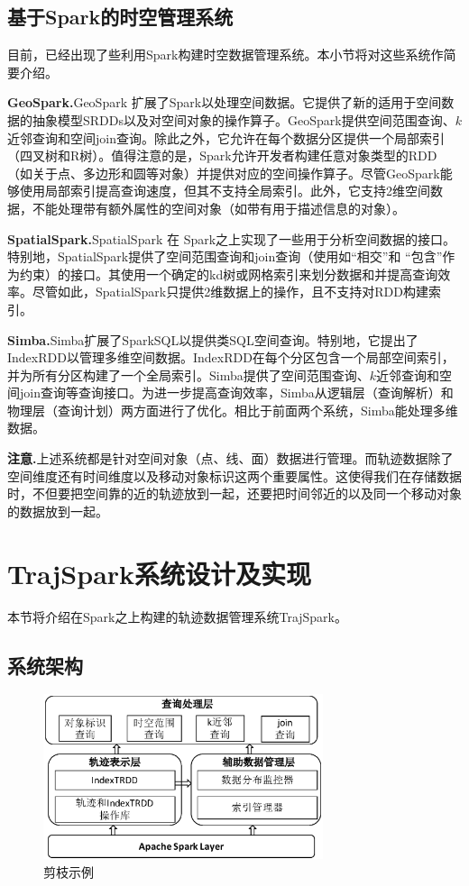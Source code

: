 \subsection{基于Spark的时空管理系统}
目前，已经出现了些利用Spark构建时空数据管理系统。本小节将对这些系统作简要介绍。

\textbf{GeoSpark.}GeoSpark 扩展了Spark以处理空间数据。它提供了新的适用于空间数据的抽象模型SRDDs以及对空间对象的操作算子。GeoSpark提供空间范围查询、$k$近邻查询和空间join查询。除此之外，它允许在每个数据分区提供一个局部索引（四叉树和R树）。值得注意的是，Spark允许开发者构建任意对象类型的RDD（如关于点、多边形和圆等对象）并提供对应的空间操作算子。尽管GeoSpark能够使用局部索引提高查询速度，但其不支持全局索引。此外，它支持2维空间数据，不能处理带有额外属性的空间对象（如带有用于描述信息的对象）。

\textbf{SpatialSpark.}SpatialSpark 在 Spark之上实现了一些用于分析空间数据的接口。特别地，SpatialSpark提供了空间范围查询和join查询（使用如``相交''和 ``包含''作为约束）的接口。其使用一个确定的kd树或网格索引来划分数据和并提高查询效率。尽管如此，SpatialSpark只提供2维数据上的操作，且不支持对RDD构建索引。

\textbf{Simba.}Simba扩展了SparkSQL以提供类SQL空间查询。特别地，它提出了IndexRDD以管理多维空间数据。IndexRDD在每个分区包含一个局部空间索引，并为所有分区构建了一个全局索引。Simba提供了空间范围查询、$k$近邻查询和空间join查询等查询接口。为进一步提高查询效率，Simba从逻辑层（查询解析）和物理层（查询计划）两方面进行了优化。相比于前面两个系统，Simba能处理多维数据。

\textbf{注意.}上述系统都是针对空间对象（点、线、面）数据进行管理。而轨迹数据除了空间维度还有时间维度以及移动对象标识这两个重要属性。这使得我们在存储数据时，不但要把空间靠的近的轨迹放到一起，还要把时间邻近的以及同一个移动对象的数据放到一起。


\section{TrajSpark系统设计及实现}\label{sec-c3-system}
本节将介绍在Spark之上构建的轨迹数据管理系统TrajSpark。

\subsection{系统架构}
\begin{figure}
	\centering
	\includegraphics[width=0.73\textwidth]{Fig/chapter3/overview}
	\caption{剪枝示例}
	\label{fig-chapter3-architecture}
\end{figure}

